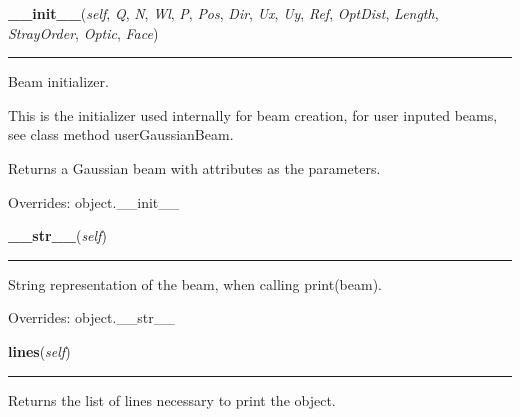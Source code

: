 \hspace{.8\funcindent}\begin{boxedminipage}{\funcwidth}

    \raggedright \textbf{\_\_init\_\_}(\textit{self}, \textit{Q}, \textit{N}, \textit{Wl}, \textit{P}, \textit{Pos}, \textit{Dir}, \textit{Ux}, \textit{Uy}, \textit{Ref}, \textit{OptDist}, \textit{Length}, \textit{StrayOrder}, \textit{Optic}, \textit{Face})

    \vspace{-1.5ex}

    \rule{\textwidth}{0.5\fboxrule}
\setlength{\parskip}{2ex}
    Beam initializer.

    This is the initializer used internally for beam creation, for user 
    inputed beams, see class method userGaussianBeam.

    Returns a Gaussian beam with attributes as the parameters.

\setlength{\parskip}{1ex}
      Overrides: object.\_\_init\_\_

    \end{boxedminipage}

    \vspace{0.5ex}

\hspace{.8\funcindent}\begin{boxedminipage}{\funcwidth}

    \raggedright \textbf{\_\_str\_\_}(\textit{self})

    \vspace{-1.5ex}

    \rule{\textwidth}{0.5\fboxrule}
\setlength{\parskip}{2ex}
    String representation of the beam, when calling print(beam).

\setlength{\parskip}{1ex}
      Overrides: object.\_\_str\_\_

    \end{boxedminipage}

    \label{theia:optics:beam:GaussianBeam:lines}

    \vspace{0.5ex}

\hspace{.8\funcindent}\begin{boxedminipage}{\funcwidth}

    \raggedright \textbf{lines}(\textit{self})

    \vspace{-1.5ex}

    \rule{\textwidth}{0.5\fboxrule}
\setlength{\parskip}{2ex}
    Returns the list of lines necessary to print the object.

\setlength{\parskip}{1ex}
    \end{boxedminipage}


